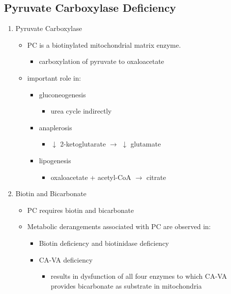 \documentclass{scrartcl}
\begin{document}
\subsection{Pyruvate Carboxylase Deficiency}
\label{sec:org40e21b8}
\begin{enumerate}
\item Pyruvate Carboxylase
\label{sec:orgdd443ba}

\begin{itemize}
\item PC is a biotinylated mitochondrial matrix enzyme.
\begin{itemize}
\item carboxylation of pyruvate to oxaloacetate
\end{itemize}


\item important role in:
\begin{itemize}
\item gluconeogenesis
\begin{itemize}
\item urea cycle indirectly
\end{itemize}
\item anaplerosis
\begin{itemize}
\item \(\downarrow\) 2-ketoglutarate \(\to\) \(\downarrow\) glutamate
\end{itemize}
\item lipogenesis
\begin{itemize}
\item oxaloacetate + acetyl-CoA \(\to\) citrate
\end{itemize}
\end{itemize}
\end{itemize}

\item Biotin and Bicarbonate
\label{sec:orga5ad289}
\begin{itemize}
\item PC requires biotin and bicarbonate
\item Metabolic derangements associated with PC are observed in:
\begin{itemize}
\item Biotin deficiency and biotinidase deficiency

\item CA-VA deficiency
\begin{itemize}
\item results in dysfunction of all four enzymes to which CA-VA
provides bicarbonate as substrate in mitochondria
\end{itemize}


\end{itemize}
\end{itemize}
\end{enumerate}
\end{document}
